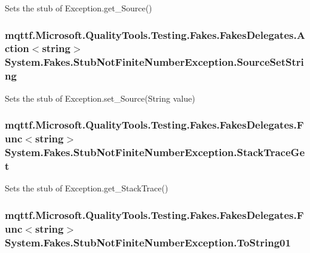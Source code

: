 Sets the stub of Exception.\-get\-\_\-\-Source()

\hypertarget{class_system_1_1_fakes_1_1_stub_not_finite_number_exception_a5f5fd6b1354e654eeb194e606daf00d1}{
\subsubsection[{Source\-Set\-String}]{\setlength{\rightskip}{0pt plus 5cm}mqttf.\-Microsoft.\-Quality\-Tools.\-Testing.\-Fakes.\-Fakes\-Delegates.\-Action$<$string$>$ System.\-Fakes.\-Stub\-Not\-Finite\-Number\-Exception.\-Source\-Set\-String}}\label{class_system_1_1_fakes_1_1_stub_not_finite_number_exception_a5f5fd6b1354e654eeb194e606daf00d1}


Sets the stub of Exception.\-set\-\_\-\-Source(\-String value)

\hypertarget{class_system_1_1_fakes_1_1_stub_not_finite_number_exception_ae1e5512061acb87df252ab453e8f7545}{
\subsubsection[{Stack\-Trace\-Get}]{\setlength{\rightskip}{0pt plus 5cm}mqttf.\-Microsoft.\-Quality\-Tools.\-Testing.\-Fakes.\-Fakes\-Delegates.\-Func$<$string$>$ System.\-Fakes.\-Stub\-Not\-Finite\-Number\-Exception.\-Stack\-Trace\-Get}}\label{class_system_1_1_fakes_1_1_stub_not_finite_number_exception_ae1e5512061acb87df252ab453e8f7545}


Sets the stub of Exception.\-get\-\_\-\-Stack\-Trace()

\hypertarget{class_system_1_1_fakes_1_1_stub_not_finite_number_exception_a2c898da48e728e0aaa5250af55058560}{
\subsubsection[{To\-String01}]{\setlength{\rightskip}{0pt plus 5cm}mqttf.\-Microsoft.\-Quality\-Tools.\-Testing.\-Fakes.\-Fakes\-Delegates.\-Func$<$string$>$ System.\-Fakes.\-Stub\-Not\-Finite\-Number\-Exception.\-To\-String01}}\label{class_system_1_1_fakes_1_1_stub_not_finite_number_exception_a2c898da48e728e0aaa5250af55058560}


